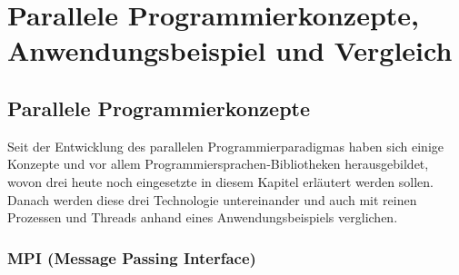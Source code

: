 
\chapter{Parallele Programmierkonzepte, Anwendungsbeispiel und Vergleich}

	\section{Parallele Programmierkonzepte}
	
		Seit der Entwicklung des parallelen Programmierparadigmas haben sich einige Konzepte und vor allem Programmiersprachen-Bibliotheken herausgebildet, wovon drei heute noch eingesetzte in diesem Kapitel erläutert werden sollen. Danach werden diese drei Technologie untereinander und auch mit reinen Prozessen und Threads anhand eines Anwendungsbeispiels verglichen.
		
		\subsection{MPI (Message Passing Interface)}
			\label{MPI}

